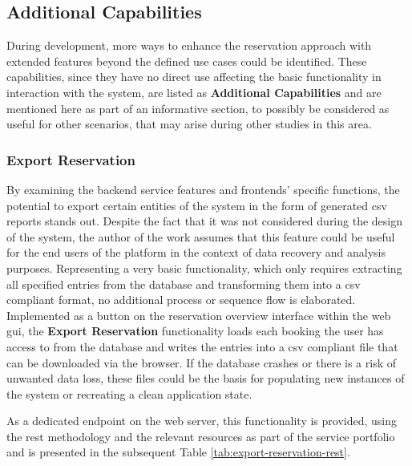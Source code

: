 \subsection{Additional Capabilities}
\label{ch:Implementation:sec:Reservation System:ssec:Additional Capabilities}

During development, more ways to enhance the reservation approach with extended features beyond the defined use cases could be identified.
These capabilities, since they have no direct use affecting the basic functionality in interaction with the system, are listed as \textbf{Additional Capabilities} and are mentioned here as part of an informative section, to possibly be considered as useful for other scenarios, that may arise during other studies in this area.

\subsubsection{Export Reservation}
\label{ch:Implementation:sec:Reservation System:ssec:Additional Capabilities:sssec:Export Reservation}

By examining the backend service features and frontends' specific functions, the potential to export certain entities of the system in the form of generated \acrshort{csv} reports stands out.
Despite the fact that it was not considered during the design of the system, the author of the work assumes that this feature could be useful for the end users of the platform in the context of data recovery and analysis purposes.
Representing a very basic functionality, which only requires extracting all specified entries from the database and transforming them into a \acrshort{csv} compliant format, no additional process or sequence flow is elaborated.
Implemented as a button on the reservation overview interface within the web \acrshort{gui}, the \textbf{Export Reservation} functionality loads each booking the user has access to from the database and writes the entries into a \acrshort{csv} compliant file that can be downloaded via the browser.
If the database crashes or there is a risk of unwanted data loss, these files could be the basis for populating new instances of the system or recreating a clean application state.

\noindent As a dedicated endpoint on the web server, this functionality is provided, using the \acrshort{rest} methodology and the relevant resources as part of the service portfolio and is presented in the subsequent Table \ref{tab:export-reservation-rest}.

